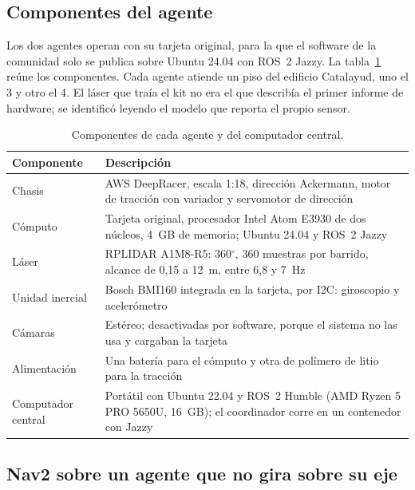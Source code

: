 \subsection{Componentes del agente}
\label{sec:componentes}

Los dos agentes operan con su tarjeta original, para la que el software de la
comunidad solo se publica sobre Ubuntu 24.04 con ROS~2 Jazzy. La
tabla~\ref{tab:vehiculo} reúne los componentes. Cada agente atiende un piso del edificio Catalayud, uno el 3 y otro el 4. El láser que traía el kit no era el que describía el primer
informe de hardware; se identificó leyendo el modelo que reporta el propio
sensor.

\begin{table}[htbp]
  \centering\small
  \caption{Componentes de cada agente y del computador central.}
  \label{tab:vehiculo}
  \begin{tabular}{@{}p{}p{}@{}}
    \toprule
    \textbf{Componente} & \textbf{Descripción} \\ \midrule
    Chasis & AWS DeepRacer, escala 1:18, dirección Ackermann, motor de tracción con variador y servomotor de dirección \\ \addlinespace
    Cómputo & Tarjeta original, procesador Intel Atom E3930 de dos núcleos, 4~GB de memoria; Ubuntu 24.04 y ROS~2 Jazzy \\ \addlinespace
    Láser & RPLIDAR A1M8-R5: 360$^\circ$, 360 muestras por barrido, alcance de 0,15 a 12~m, entre 6,8 y 7~Hz \\ \addlinespace
    Unidad inercial & Bosch BMI160 integrada en la tarjeta, por I2C: giroscopio y acelerómetro \\ \addlinespace
    Cámaras & Estéreo; desactivadas por software, porque el sistema no las usa y cargaban la tarjeta \\ \addlinespace
    Alimentación & Una batería para el cómputo y otra de polímero de litio para la tracción \\ \addlinespace
    Computador central & Portátil con Ubuntu 22.04 y ROS~2 Humble (AMD Ryzen 5 PRO 5650U, 16~GB); el coordinador corre en un contenedor con Jazzy \\ \bottomrule
  \end{tabular}
\end{table}

\subsection{Nav2 sobre un agente que no gira sobre su eje}
\label{sec:nav2-ackermann}

